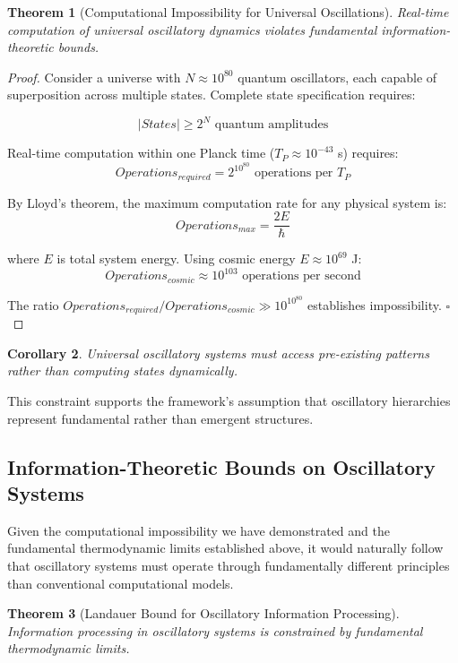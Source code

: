 \documentclass[11pt]{article}
\newtheorem{theorem}{Theorem}[section]
\newtheorem{corollary}[theorem]{Corollary}
\theoremstyle{remark}
\begin{document}
\begin{theorem}[Computational Impossibility for Universal Oscillations]
Real-time computation of universal oscillatory dynamics violates fundamental information-theoretic bounds.
\end{theorem}

\begin{proof}
Consider a universe with $N \approx 10^{80}$ quantum oscillators, each capable of superposition across multiple states. Complete state specification requires:

$$|States| \geq 2^N \text{ quantum amplitudes}$$

Real-time computation within one Planck time ($T_P \approx 10^{-43}$ s) requires:
$$Operations_{required} = 2^{10^{80}} \text{ operations per } T_P$$

By Lloyd's theorem, the maximum computation rate for any physical system is:
$$Operations_{max} = \frac{2E}{\hbar}$$

where $E$ is total system energy. Using cosmic energy $E \approx 10^{69}$ J:
$$Operations_{cosmic} \approx 10^{103} \text{ operations per second}$$

The ratio $Operations_{required}/Operations_{cosmic} \gg 10^{10^{80}}$ establishes impossibility. $\square$
\end{proof}

\begin{corollary}
Universal oscillatory systems must access pre-existing patterns rather than computing states dynamically.
\end{corollary}

This constraint supports the framework's assumption that oscillatory hierarchies represent fundamental rather than emergent structures.

\subsection{Information-Theoretic Bounds on Oscillatory Systems}

Given the computational impossibility we have demonstrated and the fundamental thermodynamic limits established above, it would naturally follow that oscillatory systems must operate through fundamentally different principles than conventional computational models.

\begin{theorem}[Landauer Bound for Oscillatory Information Processing]
Information processing in oscillatory systems is constrained by fundamental thermodynamic limits.
\end{theorem}
\end{document}
